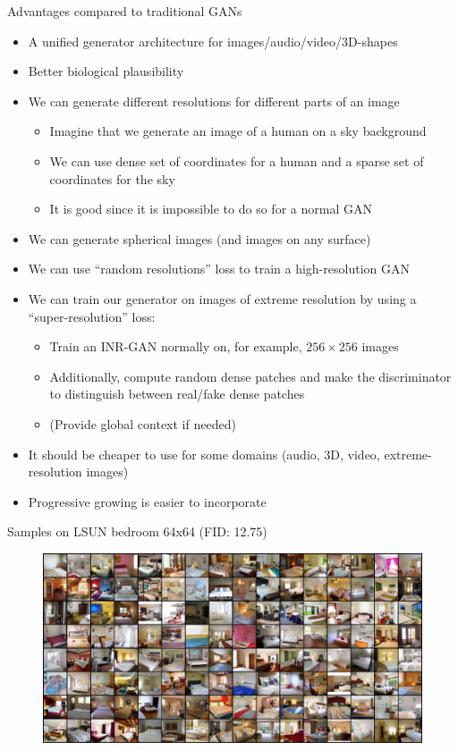 \documentclass[10pt]{beamer}
\begin{document}
\begin{frame}{Advantages compared to traditional GANs}
\begin{itemize}
    \pause\item A unified generator architecture for images/audio/video/3D-shapes
    \pause\item Better biological plausibility
    \pause\item We can generate different resolutions for different parts of an image
    \begin{itemize}
        \pause\item Imagine that we generate an image of a human on a sky background
        \pause\item We can use dense set of coordinates for a human and a sparse set of coordinates for the sky
        \pause\item It is good since it is impossible to do so for a normal GAN
    \end{itemize}
    \pause\item We can generate spherical images (and images on any surface)
    \pause\item We can use ``random resolutions'' loss to train a high-resolution GAN
    \pause\item We can train our generator on images of extreme resolution by using a ``super-resolution'' loss:
    \begin{itemize}
        \pause\item Train an INR-GAN normally on, for example, $256\times256$ images
        \pause\item Additionally, compute random dense patches and make the discriminator to distinguish between real/fake dense patches
        \pause\item (Provide global context if needed)
    \end{itemize}
    \item\pause It should be cheaper to use for some domains (audio, 3D, video, extreme-resolution images)
    \item\pause Progressive growing is easier to incorporate
\end{itemize}
\end{frame}


\begin{frame}{Samples on LSUN bedroom 64x64 (FID: 12.75)}
\begin{figure}
    \centering
    \includegraphics[width=\textwidth]{images/samples}
\end{figure}
\end{frame}
\end{document}
